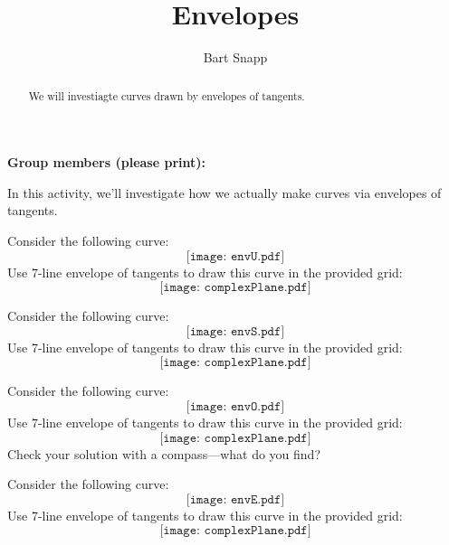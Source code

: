 \documentclass[handout,nooutcomes,noauthor]{ximera}
\title{Envelopes}
\author{Bart Snapp}
\begin{document}
\begin{abstract}
  We will investiagte curves drawn by envelopes of tangents.
\end{abstract}
\maketitle

\noindent\textbf{Group members (please print):}\ \hrulefill \\

\hrulefill

In this activity, we'll investigate how we actually make curves via
envelopes of tangents.


\begin{problem}
Consider the following curve:
\[
\texttt{[image: envU.pdf]}
\]
Use 7-line envelope of tangents to draw this curve in the provided
grid:
\[
\texttt{[image: complexPlane.pdf]}
\]
\end{problem}


\break


\begin{problem}
Consider the following curve:
\[
\texttt{[image: envS.pdf]}
\]
Use 7-line envelope of tangents to draw this curve in the provided
grid:
\[
\texttt{[image: complexPlane.pdf]}
\]
\end{problem}

\break

\begin{problem}
Consider the following curve:
\[
\texttt{[image: envO.pdf]}
\]
Use 7-line envelope of tangents to draw this curve in the provided
grid:
\[
\texttt{[image: complexPlane.pdf]}
\]
Check your solution with a compass---what do you find?
\end{problem}

\break

\begin{problem}
Consider the following curve:
\[
\texttt{[image: envE.pdf]}
\]
Use 7-line envelope of tangents to draw this curve in the provided
grid:
\[
\texttt{[image: complexPlane.pdf]}
\]
\end{problem}
\end{document}
